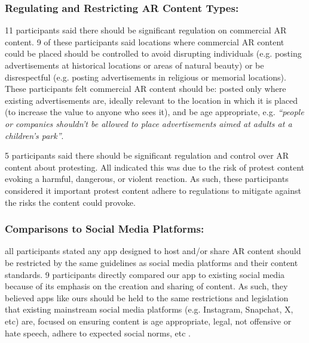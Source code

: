 \subsubsection{\textbf{Regulating and Restricting AR Content Types:}} 
11 participants said there should be significant regulation on commercial AR content. 
9 of these participants said locations where commercial AR content could be placed should be controlled to avoid disrupting individuals (e.g. posting advertisements at historical locations or areas of natural beauty) or be disrespectful (e.g. posting advertisements in religious or memorial locations). 
These participants felt commercial AR content should be: posted only where existing advertisements are, ideally relevant to the location in which it is placed (to increase the value to anyone who sees it), and be age appropriate, e.g. \textit{``people or companies shouldn't be allowed to place advertisements aimed at adults at a children's park''}.

5 participants said there should be significant regulation and control over AR content about protesting.
All indicated this was due to the risk of protest content evoking a harmful, dangerous, or violent reaction. 
As such, these participants considered it important protest content adhere to regulations to mitigate against the risks the content could provoke.


\subsubsection{\textbf{Comparisons to Social Media Platforms:}} all participants stated any app designed to host and/or share AR content should be restricted by the same guidelines as social media platforms and their content standards. 
9 participants directly compared our app to existing social media because of its emphasis on the creation and sharing of content. 
As such, they believed apps like ours should be held to the same restrictions and legislation that existing mainstream social media platforms (e.g. Instagram, Snapchat, X, etc) are, focused on ensuring content is age appropriate, legal, not offensive or hate speech, adhere to expected social norms, etc \cite{results_4}. 